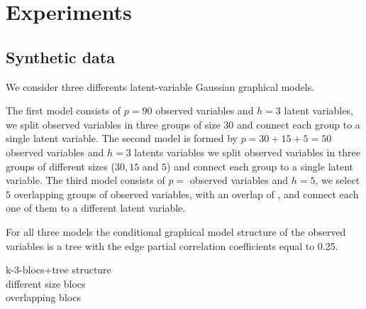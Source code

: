 \section{Experiments}
\label{experiments}

\subsection{Synthetic data}

We consider three differents latent-variable Gaussian graphical models.

The first model consists of $p=90$ observed variables and $h=3$ latent variables, we split observed variables in three groups of size $30$ and connect each group to a single latent variable. The second model is formed by $p=30+15+5=50$ observed variables and $h=3$ latents variables we split observed variables in three groups of different sizes ($30,15$ and $5$) and connect each group to a single latent variable. The third model consists of $p=$ observed variables and $h=5$, we select $5$ overlapping groups of observed variables, with an overlap of $ $, and connect each one of them to a different latent variable.

For all three models the conditional graphical model structure of the observed variables is a tree with the edge partial correlation coefficients equal to 0.25. 

k-3-blocs+tree structure\\

different size blocs\\

overlapping blocs\\


